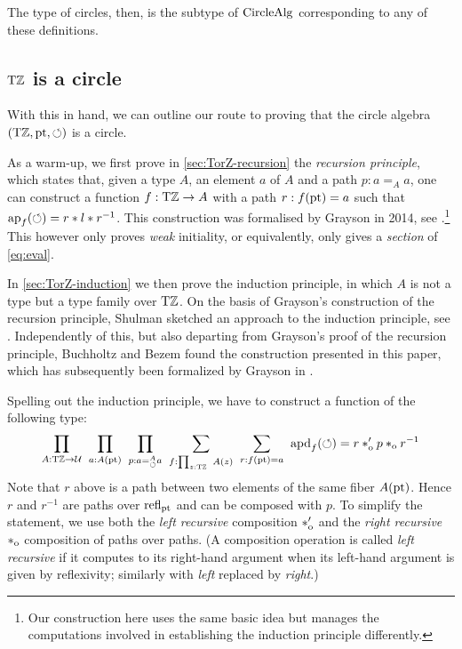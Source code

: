 \documentclass[a4paper,12pt]{amsart}
\begin{document}
The type of circles, then, is the subtype of $\mathord{\mathrm{CircleAlg}}$
corresponding to any of these definitions.

\subsection{${\mathrm{T}\mathbb{Z}}$ is a circle}\label{sec:TorZ-circle}

With this in hand, we can outline our route to proving
that the circle algebra $({\mathrm{T}\mathbb{Z}},{\mathord{\mathrm{pt}}},{\circlearrowleft})$ is a circle.

As a warm-up, we first prove in \cref{sec:TorZ-recursion}
the \emph{recursion principle},
which states that, given a type $A$, an element $a$ of $A$ and a
path $p:a=_A a$, one can construct a function $f:{\mathrm{T}\mathbb{Z}}\to A$
with a path $r:f({\mathord{\mathrm{pt}}})=a$ such that $\mathop{{\mathrm{ap}}_{f}}({\circlearrowleft})=r * l * r^{-1}$.
This construction was formalised by Grayson
in 2014, see \cite{circlerec-Dan}.\footnote{Our construction here uses the
same basic idea but manages the computations involved in establishing the
induction principle differently.}
This however only proves \emph{weak} initiality, or equivalently,
only gives a \emph{section} of \eqref{eq:eval}.

In \cref{sec:TorZ-induction} we then prove the induction principle,
in which $A$ is not a type but a type family over ${\mathrm{T}\mathbb{Z}}$.
On the basis of Grayson's construction of the recursion principle,
Shulman sketched an approach to the induction principle, see \cite{circleind-Mike}.
Independently of this, but also departing from Grayson's proof of the
recursion principle, Buchholtz and Bezem found the construction
presented in this paper, which has subsequently been formalized
by Grayson \cite{circleind-Dan,circleind-Dan-theorem} in \UniMath.

Spelling out the induction principle, we have to construct a
function of the following type:
\begin{equation}
  \label{eq:circle-induction}
  \thinmuskip=10mu              %
  \prod_{A: \TorZ\to\UU}
  \prod_{a: A(\pt)}
  \prod_{p: a=^A_{\Zloop} a}
  \sum_{f: \prod_{z:\TorZ} A(z)}
  \sum_{r: f(\pt)= a}
  {\apd{f}(\Zloop) = r\cto' p \cto r^{-1}}
\end{equation}
Note that $r$ above is a path between two elements of the same fiber $A({\mathord{\mathrm{pt}}})$.
Hence $r$ and $r^{-1}$ are paths over $\mathop{{\mathrm{refl}}_{{\mathord{\mathrm{pt}}}}}$ and can be composed with $p$.
To simplify the statement, we use both the \emph{left recursive}
composition $*_{\mathrm{o}}'$ and the \emph{right recursive} $*_{\mathrm{o}}$ composition
of paths over paths.
(A composition operation is called \emph{left recursive} if it computes to its right-hand argument when its
 left-hand argument is given by reflexivity; similarly with \emph{left} replaced by \emph{right}.)
\end{document}
